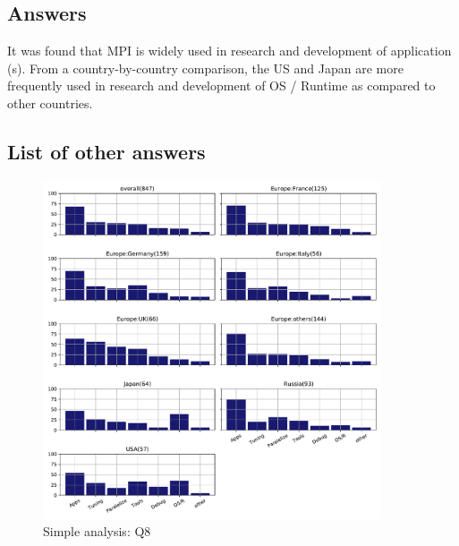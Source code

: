 
\subsection{Answers}


It was found that MPI is widely used in research and development
of application (s). From a country-by-country comparison, the US 
and Japan are more frequently used in research and development 
of OS / Runtime as compared to other countries.

\subsection{List of other answers}
\begin{itemize}

\end{itemize}

\begin{figure}[htb]
\begin{center}
\includegraphics[width=10cm]{../pdfs/Q8.pdf}
\caption{Simple analysis: Q8}
\label{fig:Q8}
\end{center}
\end{figure}
